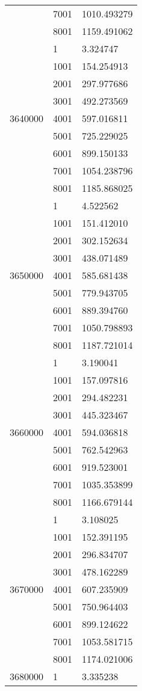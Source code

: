 \begin{table}[htb!]
\begin{tabular}{lll}
 & 7001 & 1010.493279 \\
 & 8001 & 1159.491062 \\
\multirow[c]{9}{*}{3640000} & 1 & 3.324747 \\
 & 1001 & 154.254913 \\
 & 2001 & 297.977686 \\
 & 3001 & 492.273569 \\
 & 4001 & 597.016811 \\
 & 5001 & 725.229025 \\
 & 6001 & 899.150133 \\
 & 7001 & 1054.238796 \\
 & 8001 & 1185.868025 \\
\multirow[c]{9}{*}{3650000} & 1 & 4.522562 \\
 & 1001 & 151.412010 \\
 & 2001 & 302.152634 \\
 & 3001 & 438.071489 \\
 & 4001 & 585.681438 \\
 & 5001 & 779.943705 \\
 & 6001 & 889.394760 \\
 & 7001 & 1050.798893 \\
 & 8001 & 1187.721014 \\
\multirow[c]{9}{*}{3660000} & 1 & 3.190041 \\
 & 1001 & 157.097816 \\
 & 2001 & 294.482231 \\
 & 3001 & 445.323467 \\
 & 4001 & 594.036818 \\
 & 5001 & 762.542963 \\
 & 6001 & 919.523001 \\
 & 7001 & 1035.353899 \\
 & 8001 & 1166.679144 \\
\multirow[c]{9}{*}{3670000} & 1 & 3.108025 \\
 & 1001 & 152.391195 \\
 & 2001 & 296.834707 \\
 & 3001 & 478.162289 \\
 & 4001 & 607.235909 \\
 & 5001 & 750.964403 \\
 & 6001 & 899.124622 \\
 & 7001 & 1053.581715 \\
 & 8001 & 1174.021006 \\
\multirow[c]{9}{*}{3680000} & 1 & 3.335238 \\

\end{tabular}
\end{table}
